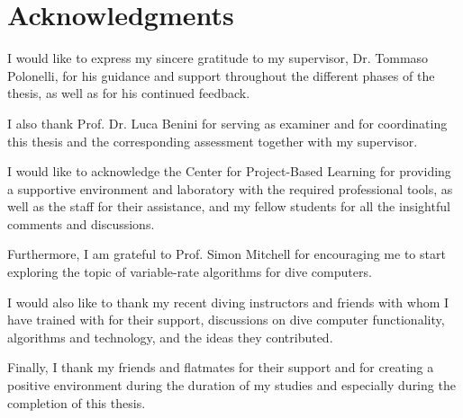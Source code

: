 
\chapter*{Acknowledgments}
I would like to express my sincere gratitude to my supervisor, Dr. Tommaso Polonelli, for his guidance and support throughout the different phases of the thesis, as well as for his continued feedback.

I also thank Prof. Dr. Luca Benini for serving as examiner and for coordinating this thesis and the corresponding assessment together with my supervisor.

I would like to acknowledge the Center for Project-Based Learning for providing a supportive environment and laboratory with the required professional tools, as well as the staff for their assistance, and my fellow students for all the insightful comments and discussions.

Furthermore, I am grateful to Prof. Simon Mitchell for encouraging me to start exploring the topic of variable-rate algorithms for dive computers.

I would also like to thank my recent diving instructors and friends with whom I have trained with for their support, discussions on dive computer functionality, algorithms and technology, and the ideas they contributed.

Finally, I thank my friends and flatmates for their support and for creating a positive environment during the duration of my studies and especially during the completion of this thesis.
